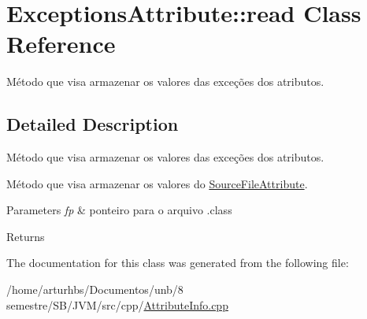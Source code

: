 \hypertarget{classExceptionsAttribute_1_1read}{}\section{Exceptions\+Attribute\+:\+:read Class Reference}
\label{classExceptionsAttribute_1_1read}


Método que visa armazenar os valores das exceções dos atributos.  




\subsection{Detailed Description}
Método que visa armazenar os valores das exceções dos atributos. 

Método que visa armazenar os valores do \hyperlink{classSourceFileAttribute}{Source\+File\+Attribute}.


\begin{DoxyParams}{Parameters}
{\em fp} & ponteiro para o arquivo .class \\
\hline
\end{DoxyParams}
\begin{DoxyReturn}{Returns}

\end{DoxyReturn}


The documentation for this class was generated from the following file\+:\begin{DoxyCompactItemize}
\item 
/home/arturhbs/\+Documentos/unb/8 semestre/\+S\+B/\+J\+V\+M/src/cpp/\hyperlink{AttributeInfo_8cpp}{Attribute\+Info.\+cpp}\end{DoxyCompactItemize}
